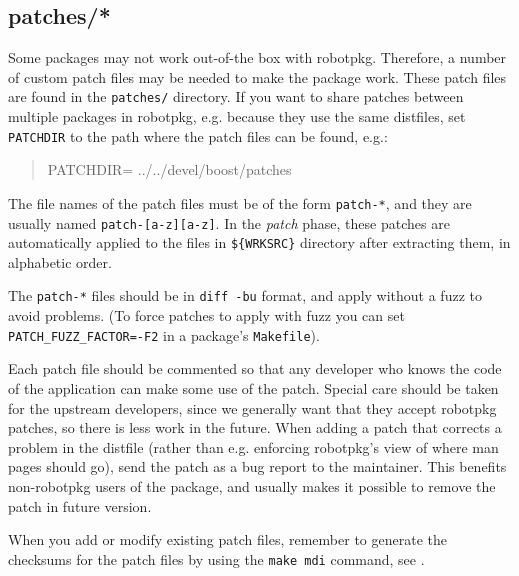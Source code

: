 \subsection{patches/*} %
\label{subsection:patches}

Some packages may not work out-of-the box with robotpkg. Therefore, a number of
custom patch  files may be needed to  make the package work.  These patch files
are found in the {\tt patches/} directory. If you want to share patches between
multiple packages  in robotpkg, e.g. because  they use the  same distfiles, set
{\tt PATCHDIR} to the path where the patch files can be found, e.g.:
\begin{quote}
   PATCHDIR= ../../devel/boost/patches
\end{quote}

The file names of the patch files must be of the form {\tt patch-*}, and they
are usually named {\tt patch-[a-z][a-z]}. In  the {\em  patch} phase,  these
patches  are automatically applied  to the  files  in {\tt \$\{WRKSRC\}}
directory after extracting them, in alphabetic order.

The {\tt patch-*} files should be in {\tt diff -bu} format, and apply without a
fuzz to avoid problems.  (To force patches to apply with fuzz  you can set {\tt
PATCH\_FUZZ\_FACTOR=-F2} in a package's {\tt Makefile}).

Each patch file should be commented so that any developer who knows the code of
the application  can make some use of  the patch. Special care  should be taken
for the upstream developers, since  we generally want that they accept robotpkg
patches, so there is less work in the future. When adding a patch that corrects
a problem in the distfile (rather than e.g. enforcing robotpkg's view of where
man pages should go), send the patch as a bug report to the maintainer. This
benefits non-robotpkg users of the package, and usually makes it possible to
remove the patch in future version.

When you add or modify existing patch files, remember to generate the checksums
for the patch files by using the {\tt make mdi} command, see
.

